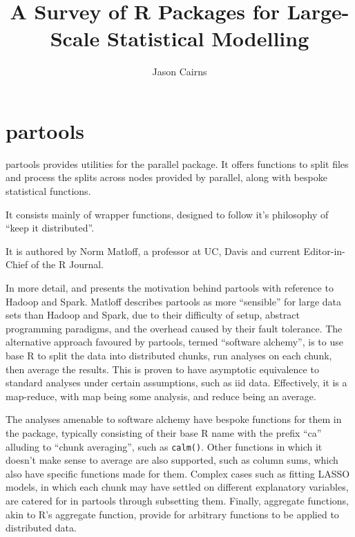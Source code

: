 \documentclass[10pt,a4paper]{article}
\begin{document}
\title{A Survey of R Packages for Large-Scale Statistical Modelling}
\author{Jason Cairns}
  
\maketitle{}
\tableofcontents{}

\section{partools}
\label{sec:partools}

partools provides utilities for the parallel
package\cite{matloff16softw_alchemy}. It offers functions to split
files and process the splits across nodes provided by parallel, along
with bespoke statistical functions.

It consists mainly of wrapper functions, designed to follow it's
philosophy of ``keep it distributed''.

It is authored by Norm Matloff, a professor at UC, Davis and current
Editor-in-Chief of the R Journal.

In more detail, \textcite{matloff15} and \textcite{matloff17} presents
the motivation behind partools with reference to Hadoop and Spark.
Matloff describes partools as more ``sensible'' for large data sets
than Hadoop and Spark, due to their difficulty of setup, abstract
programming paradigms, and the overhead caused by their fault
tolerance. The alternative approach favoured by partools, termed
``software alchemy'', is to use base R to split the data into
distributed chunks, run analyses on each chunk, then average the
results. This is proven to have asymptotic equivalence to standard
analyses under certain assumptions, such as iid data. Effectively, it
is a map-reduce, with map being some analysis, and reduce being an
average.

The analyses amenable to software alchemy have bespoke functions for
them in the package, typically consisting of their base R name with
the prefix ``ca'' alluding to ``chunk averaging'', such as
\texttt{calm()}. Other functions in which it doesn't make sense to
average are also supported, such as column sums, which also have
specific functions made for them. Complex cases such as fitting LASSO
models, in which each chunk may have settled on different explanatory
variables, are catered for in partools through subsetting them.
Finally, aggregate functions, akin to R's aggregate function, provide
for arbitrary functions to be applied to distributed data.
\end{document}
